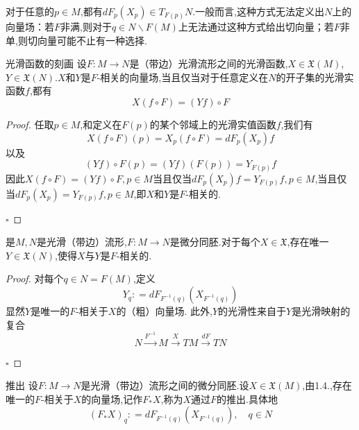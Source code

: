 \documentclass[../../几何与拓扑.tex]{subfiles}
\begin{document}
\begin{note}

    对于任意的$p \in M$,都有$dF_{p}\left( X_{p} \right) \in T_{F\left( p \right)}N$.一般而言,这种方式无法定义出$N$上的向量场：若$F$非满,则对于$q \in N \backslash F\left( M \right)$上无法通过这种方式给出切向量；若$F$非单,则切向量可能不止有一种选择.

\end{note}

\begin{proposition}{光滑函数的刻画}\label{F-相关性的光滑函数刻画}
    设$F:M\to N$是（带边）光滑流形之间的光滑函数,$X \in \mathfrak{X}\left( M \right)$,$Y \in \mathfrak{X}\left( N \right)$.$X$和$Y$是$F$-相关的向量场,当且仅当对于任意定义在$N$的开子集的光滑实函数$f$,都有 $$ X\left( f\circ F \right) = \left( Yf \right) \circ F $$
\end{proposition}
\begin{proof}
    任取$p \in M$,和定义在$F\left( p \right)$的某个邻域上的光滑实值函数$f$,我们有 $$ X\left( f\circ F \right) \left( p \right) =X_{p}\left( f\circ F \right) = dF_{p}\left( X_{p} \right) f $$以及 $$ \left( Yf \right) \circ F\left( p \right) = \left( Yf \right) \left( F\left( p \right)  \right) = Y_{F\left( p \right) }f $$因此$X\left( f\circ F \right)=\left( Yf \right)\circ F,p \in M$当且仅当$dF_{p}\left( X_{p} \right)f= Y_{F\left( p \right)}f,p \in M$,当且仅当$dF_{p}\left( X_{p} \right)= Y_{F\left( p \right)}f,p \in M$,即$X$和$Y$是$F$-相关的.

    \hfill $\square$
\end{proof}

\begin{proposition}
    是$M,N$是光滑（带边）流形,$F:M\to N$是微分同胚.对于每个$X \in \mathfrak{X}$,存在唯一$Y \in \mathfrak{X}\left( N \right)$,使得$X$与$Y$是$F$-相关的.
\end{proposition}

\begin{proof}
    对每个$q  \in N=F\left( M \right)$,定义 $$ Y_{q}: = dF_{F^{-1}\left( q \right) }\left( X_{F^{-1}\left( q \right) } \right)  $$显然$Y$是唯一的$F$-相关于$X$的（粗）向量场.
此外,$Y$的光滑性来自于$Y$是光滑映射的复合$$ N \xrightarrow{F^{-1}} M \xrightarrow{X}TM \xrightarrow{dF} TN$$

    \hfill $\square$
\end{proof}

\begin{definition}{推出}
    设$F:M\to N$是光滑（带边）流形之间的微分同胚.设$X \in \mathfrak{X}\left( M \right)$,由1.4.,存在唯一的$F$-相关于$X$的向量场,记作$F_{*}X$,称为$X$通过$F$的推出.具体地 $$ \left( F_{*}X \right) _{q}: = dF_{F^{-1}\left( q \right) }\left( X_{F^{-1}\left( q \right) } \right) ,\quad  q \in N $$
\end{definition}
\end{document}
